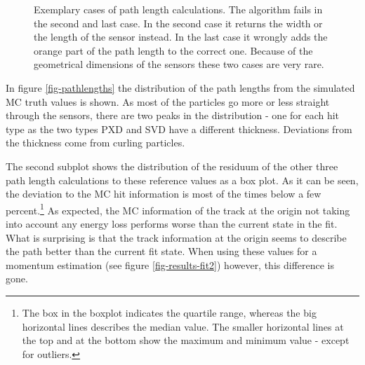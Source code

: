 \begin{figure}
  \caption[Exemplary cases of path length calculations.]{Exemplary cases of path length calculations. The algorithm fails in the second and last case. In the second case it returns the width or the length of the sensor instead. In the last case it wrongly adds the orange part of the path length to the correct one. Because of the geometrical dimensions of the sensors these two cases are very rare.}
  \label{fig-errors-in-path-length}
\end{figure}

In figure \ref{fig-pathlengths} the distribution of the path lengths from the simulated MC truth values is shown. As most of the particles go more or less straight through the sensors, there are two peaks in the distribution - one for each hit type as the two types PXD and SVD have a different thickness. Deviations from the thickness come from curling particles.

The second subplot shows the distribution of the residuum of the other three path length calculations to these reference values as a box plot. As it can be seen, the deviation to the MC hit information is most of the times below a few percent.\footnote{The box in the boxplot indicates the quartile range, whereas the big horizontal lines describes the median value. The smaller horizontal lines at the top and at the bottom show the maximum and minimum value - except for outliers.} As expected, the MC information of the track at the origin not taking into account any energy loss performs worse than the current state in the fit. What is surprising is that the track information at the origin seems to describe the path better than the current fit state. When using these values for a momentum estimation (see figure \ref{fig-results-fit2}) however, this difference is gone.

